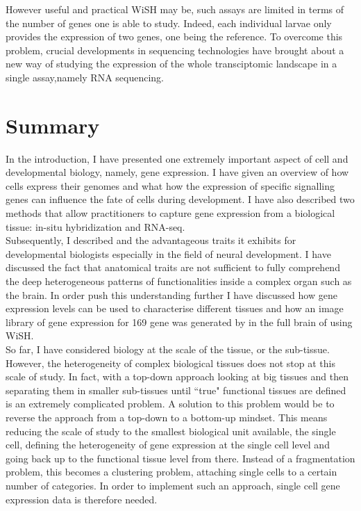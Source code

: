 	However useful and practical WiSH may be, such assays are limited in terms of the number of genes one is able to study. Indeed, each individual larvae only provides the expression of two genes, one being the reference. To overcome this problem, crucial developments in sequencing technologies have brought about a new way of studying the expression of the whole transciptomic landscape in a single assay,namely RNA sequencing.


    
\section{Summary}
     
     

	In the introduction, I have presented one extremely important aspect of cell and developmental biology, namely, gene expression. I have given an overview of how cells express their genomes and what how the expression of specific signalling genes can influence the fate of cells during development. I have also described two methods that allow practitioners to capture gene expression from a biological tissue: in-situ hybridization and RNA-seq.\\
	
	Subsequently, I described \platyfull{} and the advantageous traits it exhibits for developmental biologists especially in the field of neural development. I have discussed the fact that anatomical traits are not sufficient to fully comprehend the deep heterogeneous patterns of functionalities inside a complex organ such as the brain. In order push this understanding further I have discussed how gene expression levels can be used to characterise different tissues and how an image library of gene expression for 169 gene was generated by \cite{Tomer10} in the full brain of \platy{} using WiSH.\\
	
	So far, I have considered biology at the scale of the tissue, or the sub-tissue. However, the heterogeneity of complex biological tissues does not stop at this scale of study. In fact, with a top-down approach looking at big tissues and then separating them in smaller sub-tissues until ``true" functional tissues are defined is an extremely complicated problem. A solution to this problem would be to reverse the approach from a top-down to a bottom-up mindset. This means reducing the scale of study to the smallest biological unit available, the single cell, defining the heterogeneity of gene expression at the single cell level and going back up to the functional tissue level from there. Instead of a fragmentation problem, this becomes a clustering problem, attaching single cells to a certain number of categories. In order to implement such an approach, single cell gene expression data is therefore needed.\\
	
